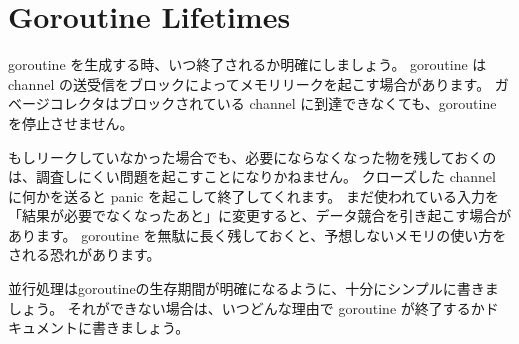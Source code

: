 \section{Goroutine Lifetimes}


goroutine を生成する時、いつ終了されるか明確にしましょう。 goroutine は channel の送受信をブロックによってメモリリークを起こす場合があります。 ガベージコレクタはブロックされている channel に到達できなくても、goroutine を停止させません。

もしリークしていなかった場合でも、必要にならなくなった物を残しておくのは、調査しにくい問題を起こすことになりかねません。 クローズした channel に何かを送ると panic を起こして終了してくれます。 まだ使われている入力を「結果が必要でなくなったあと」に変更すると、データ競合を引き起こす場合があります。 goroutine を無駄に長く残しておくと、予想しないメモリの使い方をされる恐れがあります。

並行処理はgoroutineの生存期間が明確になるように、十分にシンプルに書きましょう。 それができない場合は、いつどんな理由で goroutine が終了するかドキュメントに書きましょう。
